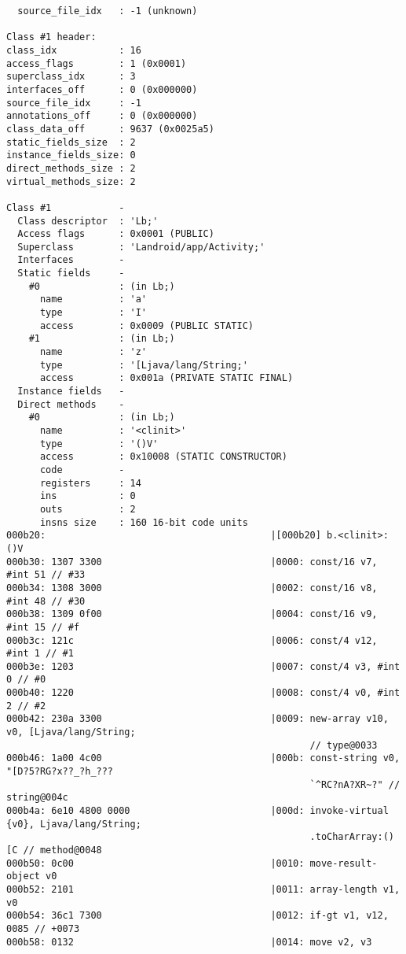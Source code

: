 \begin{lstlisting}
  source_file_idx   : -1 (unknown)

Class #1 header:
class_idx           : 16
access_flags        : 1 (0x0001)
superclass_idx      : 3
interfaces_off      : 0 (0x000000)
source_file_idx     : -1
annotations_off     : 0 (0x000000)
class_data_off      : 9637 (0x0025a5)
static_fields_size  : 2
instance_fields_size: 0
direct_methods_size : 2
virtual_methods_size: 2

Class #1            -
  Class descriptor  : 'Lb;'
  Access flags      : 0x0001 (PUBLIC)
  Superclass        : 'Landroid/app/Activity;'
  Interfaces        -
  Static fields     -
    #0              : (in Lb;)
      name          : 'a'
      type          : 'I'
      access        : 0x0009 (PUBLIC STATIC)
    #1              : (in Lb;)
      name          : 'z'
      type          : '[Ljava/lang/String;'
      access        : 0x001a (PRIVATE STATIC FINAL)
  Instance fields   -
  Direct methods    -
    #0              : (in Lb;)
      name          : '<clinit>'
      type          : '()V'
      access        : 0x10008 (STATIC CONSTRUCTOR)
      code          -
      registers     : 14
      ins           : 0
      outs          : 2
      insns size    : 160 16-bit code units
000b20:                                        |[000b20] b.<clinit>:()V
000b30: 1307 3300                              |0000: const/16 v7, #int 51 // #33
000b34: 1308 3000                              |0002: const/16 v8, #int 48 // #30
000b38: 1309 0f00                              |0004: const/16 v9, #int 15 // #f
000b3c: 121c                                   |0006: const/4 v12, #int 1 // #1
000b3e: 1203                                   |0007: const/4 v3, #int 0 // #0
000b40: 1220                                   |0008: const/4 v0, #int 2 // #2
000b42: 230a 3300                              |0009: new-array v10, v0, [Ljava/lang/String;
                                                      // type@0033
000b46: 1a00 4c00                              |000b: const-string v0, "[D?5?RG?x??_?h_???
                                                      `^RC?nA?XR~?" // string@004c
000b4a: 6e10 4800 0000                         |000d: invoke-virtual {v0}, Ljava/lang/String;
                                                      .toCharArray:()[C // method@0048
000b50: 0c00                                   |0010: move-result-object v0
000b52: 2101                                   |0011: array-length v1, v0
000b54: 36c1 7300                              |0012: if-gt v1, v12, 0085 // +0073
000b58: 0132                                   |0014: move v2, v3

\end{lstlisting}
